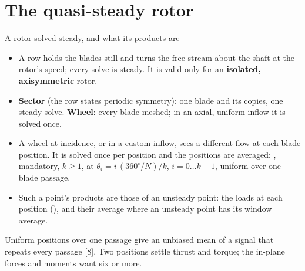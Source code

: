 %
%

\section{The quasi-steady rotor}

\begin{frame}{A rotor solved steady, and what its products are}
\begin{itemize}\small
  \item A  row holds the blades still and turns the free
        stream about the shaft at the rotor's speed; every solve is steady. It
        is valid only for an \textbf{isolated, axisymmetric} rotor.
  \item \textbf{Sector} (the row states periodic symmetry): one blade and its
        copies, one steady solve. \textbf{Wheel}: every blade meshed; in an
        axial, uniform inflow it is solved once.
  \item A wheel at incidence, or in a custom inflow, sees a different flow at
        each blade position. It is solved once per position and the
        positions are averaged: , mandatory,
        \(k \ge 1\), at \(\theta_i = i\,(360^\circ/N)/k\), \(i = 0 \ldots
        k-1\), uniform over one blade passage.
  \item Such a point's products are those of an unsteady point: the loads at
        each position (), and their average where an
        unsteady point has its window average.
\end{itemize}
\begin{takeaway}Uniform positions over one passage give an unbiased mean of a
signal that repeats every passage [8]. Two positions settle thrust and
torque; the in-plane forces and moments want six or more.\end{takeaway}
\end{frame}

